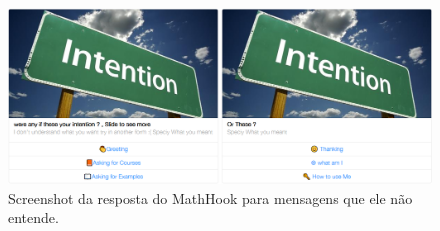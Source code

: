 \begin{figure}[h!tbp]
    \centering
    \includegraphics[width=1.1\linewidth]{img/bot1_4.png}
    \caption{Screenshot da resposta do MathHook para mensagens que ele não entende.}
    \label{fig:bot1_4}
\end{figure}
